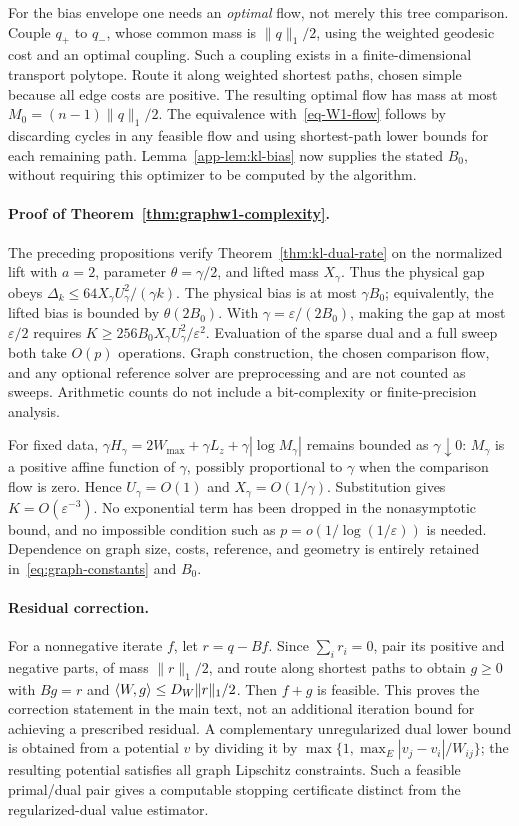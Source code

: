 For the bias envelope one needs an \emph{optimal} flow, not merely this tree comparison. Couple $q_+$ to $q_-$, whose common mass is $\|q\|_1/2$, using the weighted geodesic cost and an optimal coupling. Such a coupling exists in a finite-dimensional transport polytope. Route it along weighted shortest paths, chosen simple because all edge costs are positive. The resulting optimal flow has mass at most $M_0=(n-1)\|q\|_1/2$. The equivalence with~\eqref{eq-W1-flow} follows by discarding cycles in any feasible flow and using shortest-path lower bounds for each remaining path. Lemma~\ref{app-lem:kl-bias} now supplies the stated $B_0$, without requiring this optimizer to be computed by the algorithm.

\paragraph{Proof of Theorem~\ref{thm:graphw1-complexity}.}
The preceding propositions verify Theorem~\ref{thm:kl-dual-rate} on the normalized lift with $a=2$, parameter $\theta=\gamma/2$, and lifted mass $X_\gamma$. Thus the physical gap obeys $\Delta_k\leq64X_\gamma U_\gamma^2/(\gamma k)$. The physical bias is at most $\gamma B_0$; equivalently, the lifted bias is bounded by $\theta(2B_0)$. With $\gamma=\varepsilon/(2B_0)$, making the gap at most $\varepsilon/2$ requires $K\geq256B_0X_\gamma U_\gamma^2/\varepsilon^2$. Evaluation of the sparse dual and a full sweep both take $O(p)$ operations. Graph construction, the chosen comparison flow, and any optional reference solver are preprocessing and are not counted as sweeps. Arithmetic counts do not include a bit-complexity or finite-precision analysis.

For fixed data, $\gamma H_\gamma=2W_{\max}+\gamma L_z+\gamma|\log M_\gamma|$ remains bounded as $\gamma\downarrow0$: $M_\gamma$ is a positive affine function of $\gamma$, possibly proportional to $\gamma$ when the comparison flow is zero. Hence $U_\gamma=O(1)$ and $X_\gamma=O(1/\gamma)$. Substitution gives $K=O(\varepsilon^{-3})$. No exponential term has been dropped in the nonasymptotic bound, and no impossible condition such as $p=o(1/\log(1/\varepsilon))$ is needed. Dependence on graph size, costs, reference, and geometry is entirely retained in~\eqref{eq:graph-constants} and $B_0$.

\paragraph{Residual correction.}
For a nonnegative iterate $f$, let $r=q-Bf$. Since $\sum_i r_i=0$, pair its positive and negative parts, of mass $\|r\|_1/2$, and route along shortest paths to obtain $g\geq0$ with $Bg=r$ and $\langle W,g\rangle\leq D_W\|r\|_1/2$. Then $f+g$ is feasible. This proves the correction statement in the main text, not an additional iteration bound for achieving a prescribed residual. A complementary unregularized dual lower bound is obtained from a potential $v$ by dividing it by $\max\{1,\max_E|v_j-v_i|/W_{ij}\}$; the resulting potential satisfies all graph Lipschitz constraints. Such a feasible primal/dual pair gives a computable stopping certificate distinct from the regularized-dual value estimator.
